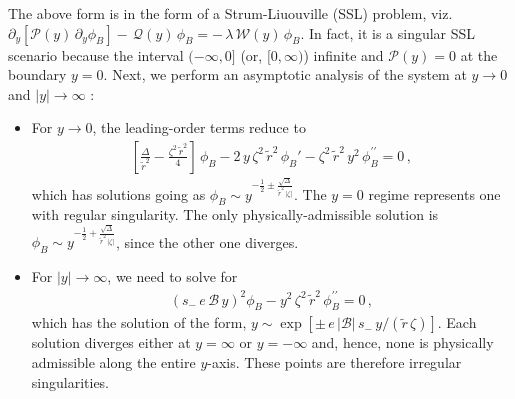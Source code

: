 \documentclass[aps,prb, onecolumn,nofootinbib,citeautoscript,10pt]{revtex4-2}
\def \nn{\nonumber \\}
\begin{document}
The above form is in the form of a Strum-Liuouville (SSL) problem, viz. $\partial_y \left[ \mathcal P (y)\,\partial_y \phi_B \right ] - \, {\mathcal Q} (y)\,\phi_B = -\,\lambda\, {\mathcal W}(y)\,\phi_B $. In fact, it is a singular SSL scenario because the interval $(-\infty, 0]$ (or, $ [0, \infty)$) infinite and ${\mathcal P} (y) = 0$ at the boundary $y= 0$. Next, we perform an asymptotic analysis of the system at $y\rightarrow0$ and $ |y| \rightarrow \infty$ \cite{strained-dirac-franz}:
\begin{itemize}
\item For $y\rightarrow0$, the leading-order terms reduce to
\begin{align}
\left[\frac{\Delta}{\tilde{r}^2}-\frac{\zeta^2\,\tilde{r}^2}{4} \right] \, \phi_B 
-2 \,y \, \zeta^2 \, \tilde{r}^2  \, \phi_B'- \zeta^2 \, \tilde{r}^2 \,y^2 \, \phi_B^{\prime \prime}=0 \,,
\end{align}
which has solutions going as $\phi_B \sim y^{-\frac{1}{2}\pm{\frac{\sqrt{\Delta}}{\tilde{r}^2 \, |\zeta|}}} $. The $y=0$ regime represents one with regular singularity. The only physically-admissible solution is  $ \phi_B \sim y^{-\frac{1}{2}+{\frac{\sqrt{\Delta}}{\tilde{r}^2 \, |\zeta|}}} $, since the other one diverges. 

\item For $ |y| \rightarrow\infty$, we need to solve for
\begin{align}
\left (s_{-}\,e \, {\mathcal B}\,y \right )^2  \phi_B -y^2 \,\zeta^2 \, \tilde{r}^2 \, \phi_B^{\prime \prime}=0 \, ,
\end{align}
which has the solution of the form, $ y \sim \exp \left [ {\pm \, e\, |{\mathcal B}|  \,s_{-} \, y} /(\tilde r \, \zeta) \right ] $. 
Each solution diverges either at $ y = \infty$ or $y=-\infty $ and, hence, none is physically admissible along the entire $y$-axis. These points are therefore irregular singularities.

\end{itemize}
\end{document}
